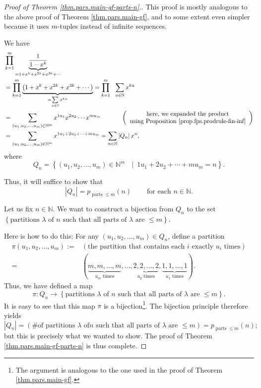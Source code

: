 \begin{proof}
[Proof of Theorem \ref{thm.pars.main-gf-parts-n}.]This proof is mostly
analogous to the above proof of Theorem \ref{thm.pars.main-gf}, and to some
extent even simpler because it uses $m$-tuples instead of infinite sequences.

We have%
\begin{align*}
&  \prod_{k=1}^{m}\underbrace{\dfrac{1}{1-x^{k}}}_{=1+x^{k}+x^{2k}%
+x^{3k}+\cdots}\\
&  =\prod_{k=1}^{m}\underbrace{\left(  1+x^{k}+x^{2k}+x^{3k}+\cdots\right)
}_{=\sum\limits_{u\in\mathbb{N}}x^{ku}}=\prod_{k=1}^{m}\ \ \sum_{u\in
\mathbb{N}}x^{ku}\\
&  =\sum_{\left(  u_{1},u_{2},\ldots,u_{m}\right)  \in\mathbb{N}^{m}}%
x^{1u_{1}}x^{2u_{2}}\cdots x^{mu_{m}}\ \ \ \ \ \ \ \ \ \ \left(
\begin{array}
[c]{c}%
\text{here, we expanded the product}\\
\text{using Proposition \ref{prop.fps.prodrule-fin-inf}}%
\end{array}
\right) \\
&  =\sum_{\left(  u_{1},u_{2},\ldots,u_{m}\right)  \in\mathbb{N}^{m}}%
x^{1u_{1}+2u_{2}+\cdots+mu_{m}}=\sum_{n\in\mathbb{N}}\left\vert Q_{n}%
\right\vert x^{n},
\end{align*}
where
\[
Q_{n}=\left\{  \left(  u_{1},u_{2},\ldots,u_{m}\right)  \in\mathbb{N}%
^{m}\text{ }\mid\ 1u_{1}+2u_{2}+\cdots+mu_{m}=n\right\}  .
\]


Thus, it will suffice to show that%
\[
\left\vert Q_{n}\right\vert =p_{\operatorname*{parts}\leq m}\left(  n\right)
\ \ \ \ \ \ \ \ \ \ \text{for each }n\in\mathbb{N}.
\]


Let us fix $n\in\mathbb{N}$. We want to construct a bijection from $Q_{n}$ to
the set $\left\{  \text{partitions }\lambda\text{ of }n\text{ such that all
parts of }\lambda\text{ are }\leq m\right\}  $.

Here is how to do this: For any $\left(  u_{1},u_{2},\ldots,u_{m}\right)  \in
Q_{n}$, define a partition%
\begin{align*}
\pi\left(  u_{1},u_{2},\ldots,u_{m}\right)  :=  &  \left(  \text{the partition
that contains each }i\text{ exactly }u_{i}\text{ times}\right) \\
=  &  \left(  \underbrace{m,m,\ldots,m}_{u_{m}\text{ times}},\ldots
,\underbrace{2,2,\ldots,2}_{u_{2}\text{ times}},\underbrace{1,1,\ldots
,1}_{u_{1}\text{ times}}\right)  .
\end{align*}
Thus, we have defined a map
\[
\pi:Q_{n}\rightarrow\left\{  \text{partitions }\lambda\text{ of }n\text{ such
that all parts of }\lambda\text{ are }\leq m\right\}  .
\]
It is easy to see that this map $\pi$ is a bijection\footnote{The argument is
analogous to the one used in the proof of Theorem \ref{thm.pars.main-gf}.}.
The bijection principle therefore yields
\[
\left\vert Q_{n}\right\vert =\left(  \text{\# of partitions }\lambda\text{ of
}n\text{ such that all parts of }\lambda\text{ are }\leq m\right)
=p_{\operatorname*{parts}\leq m}\left(  n\right)  ;
\]
but this is precisely what we wanted to show. The proof of Theorem
\ref{thm.pars.main-gf-parts-n} is thus complete.
\end{proof}

